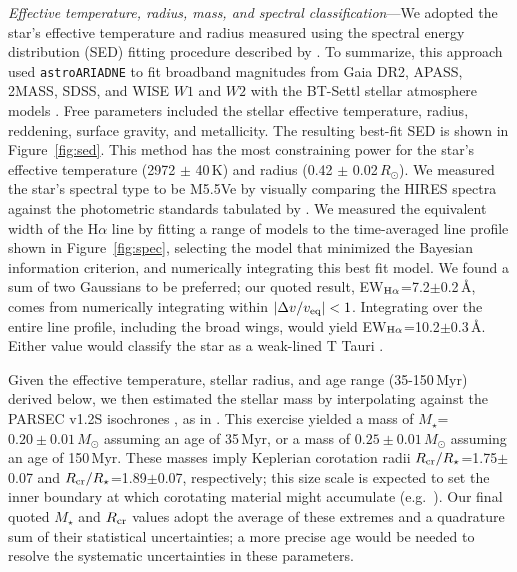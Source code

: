 \documentclass[11pt,twocolumn,tighten]{aastex7}
\begin{document}
{\it Effective temperature, radius, mass, and spectral
classification}---We adopted the star's effective temperature and
radius measured using the spectral energy distribution (SED) fitting
procedure described by \citet{Bouma2024}.  To summarize, this approach
used \texttt{astroARIADNE} \citep{Vines2022} to fit broadband
magnitudes from Gaia DR2, APASS, 2MASS, SDSS, and WISE $W1$ and $W2$
with the BT-Settl stellar atmosphere models \citep{Allard2012}.
Free parameters included  the stellar effective temperature,
radius, reddening, surface gravity, and metallicity.  The resulting
best-fit SED is shown in Figure~\ref{fig:sed}.  This method has the
most constraining power for the star's effective temperature (2972
$\pm$ 40\,K) and radius (0.42 $\pm$ 0.02\,$R_\odot$).  We measured the
star's spectral type to be M5.5Ve by visually comparing the HIRES
spectra against the photometric standards tabulated by
\citet{Bochanski2007}.   We measured the equivalent width of the
H$\alpha$ line by fitting a range of models to the time-averaged line
profile shown in Figure~\ref{fig:spec}, selecting the model that
minimized the Bayesian information criterion, and numerically
integrating this best fit model.  We found a sum of two Gaussians to
be preferred; our quoted result, EW$_{{\rm
H}\alpha}$=7.2$\pm$0.2\,\AA, comes from numerically integrating within
$|\Delta v/v_{\rm eq}|<1$.  Integrating over the entire line profile,
including the broad wings, would yield EW$_{{\rm
H}\alpha}$=10.2$\pm$0.3\,\AA. Either value would classify the star as
a weak-lined T Tauri \citep{Briceno2019}.

Given the effective temperature, stellar radius, and age range
(35-150\,Myr) derived below, we then estimated the stellar mass by
interpolating against the PARSEC v1.2S isochrones \citep{Chen2014}, as
in \citet{Bouma2024}.  This exercise yielded a mass of
$M_\star$=$0.20\pm0.01$\,$M_\odot$ assuming an age of 35\,Myr, or a
mass of $0.25\pm0.01$\,$M_\odot$ assuming an age of 150\,Myr.  These
masses imply Keplerian corotation radii $R_{\rm
cr}/R_\star$=1.75$\pm$0.07 and $R_{\rm cr}/R_\star$=1.89$\pm$0.07,
respectively; this size scale is expected to set the inner boundary at
which corotating material might accumulate
(e.g.~\citealt{Townsend2005,Daley-Yates2024}).  Our final quoted
$M_\star$ and $R_{\rm cr}$ values adopt the average of these extremes
and a quadrature sum of their statistical uncertainties; a more
precise age would be needed to resolve the systematic uncertainties in
these parameters.
\end{document}
